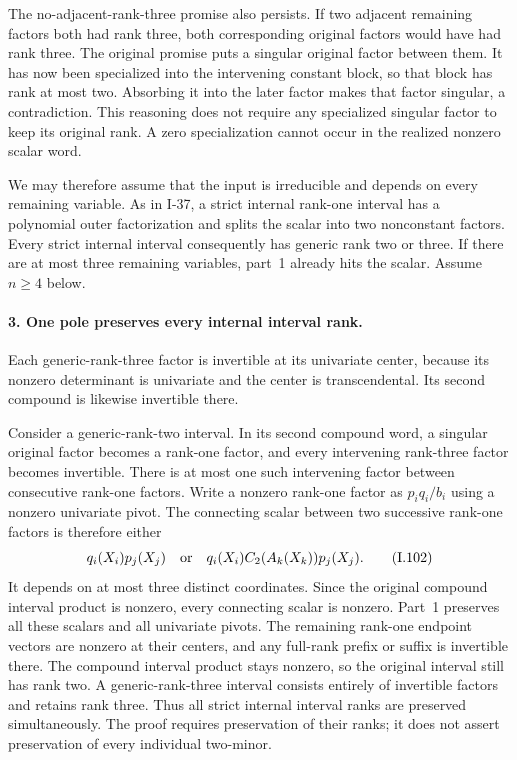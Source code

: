 The no-adjacent-rank-three promise also persists. If two adjacent
remaining factors both had rank three, both corresponding
original factors would have had rank three. The original promise
puts a singular original factor between them. It has now been
specialized into the intervening constant block, so that block
has rank at most two. Absorbing it into the later factor makes
that factor singular, a contradiction. This reasoning does not
require any specialized singular factor to keep its original
rank. A zero specialization cannot occur in the realized nonzero
scalar word.

We may therefore assume that the input is irreducible and depends
on every remaining variable. As in I-37, a strict internal
rank-one interval has a polynomial outer factorization and
splits the scalar into two nonconstant factors. Every strict
internal interval consequently has generic rank two or three.
If there are at most three remaining variables, part~1 already
hits the scalar. Assume $n\ge4$ below.

\paragraph{3. One pole preserves every internal interval rank.}
Each generic-rank-three factor is invertible at its univariate
center, because its nonzero determinant is univariate and the
center is transcendental. Its second compound is likewise
invertible there.

Consider a generic-rank-two interval. In its second compound
word, a singular original factor becomes a rank-one factor,
and every intervening rank-three factor becomes invertible.
There is at most one such intervening factor between consecutive
rank-one factors. Write a nonzero rank-one factor as $p_iq_i/b_i$
using a nonzero univariate pivot. The connecting scalar between
two successive rank-one factors is therefore either
\[
 q_i(X_i)p_j(X_j)
 \quad\hbox{or}\quad
 q_i(X_i)C_2(A_k(X_k))p_j(X_j).
 \tag{I.102}
\]
It depends on at most three distinct coordinates. Since the
original compound interval product is nonzero, every connecting
scalar is nonzero. Part~1 preserves all these scalars and all
univariate pivots. The remaining rank-one endpoint vectors are
nonzero at their centers, and any full-rank prefix or suffix is
invertible there. The compound interval product stays nonzero,
so the original interval still has rank two. A generic-rank-three
interval consists entirely of invertible factors and retains
rank three. Thus all strict internal interval ranks are preserved
simultaneously. The proof requires preservation of their ranks;
it does not assert preservation of every individual two-minor.


